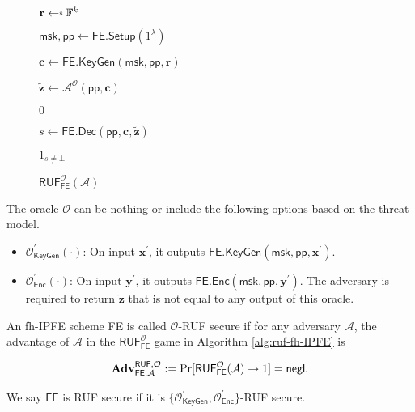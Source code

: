 \begin{figure}[H]
\centering

	\begin{minipage}[t]{0.55\textwidth}
	\begin{algorithm}[H]
	\caption{$\textsf{RUF}^{\mathcal{O}}_{\textsf{FE}}(\mathcal{A})$}
	\label{alg:ruf-fh-IPFE}
	\begin{algorithmic}[1]
		\State $\mathbf{r} \getsdollar \mathbb{F}^{k}$ \label{alg:oracle-ruf-fh-IPFE:r}

		\State $\textsf{msk}, \textsf{pp} \gets \textsf{FE.Setup}(1^\lambda)$

		\State $\mathbf{c} \gets \textsf{FE.KeyGen}(\textsf{msk}, \textsf{pp}, \mathbf{r})$

		\State $\mathbf{\tilde{z}} \gets \mathcal{A}^{\mathcal{O}} ( \textsf{pp}, \mathbf{c} )$

			
			\State \Return $0$
		
		\EndIf

		\State $s \gets \textsf{FE.Dec}(\textsf{pp}, \mathbf{c}, \mathbf{\tilde{z}} )$

		\State \Return $1_{s \neq \bot}$
	\end{algorithmic}
	\end{algorithm}
	\end{minipage}

\end{figure}

The oracle $\mathcal{O}$ can be nothing or include the following options based on the threat model.

\begin{itemize}

	\item $\mathcal{O}^\prime_{\textsf{KeyGen}}(\cdot)$: On input $\mathbf{x}^\prime$, it outputs $\textsf{FE.KeyGen}(\textsf{msk}, \textsf{pp}, \mathbf{x}^\prime)$.
	
	\item $\mathcal{O}^\prime_{\textsf{Enc}}(\cdot)$: On input $\mathbf{y}^\prime$, it outputs $\textsf{FE.Enc}(\textsf{msk}, \textsf{pp}, \mathbf{y}^\prime)$. The adversary is required to return $\mathbf{\tilde{z}}$ that is not equal to any output of this oracle.
\end{itemize}

\begin{definition}

	An fh-IPFE scheme \textsf{FE} is called $\mathcal{O}$-RUF secure if for any adversary $\mathcal{A}$, the advantage of $\mathcal{A}$ in the $\textsf{RUF}^{\mathcal{O}}_\textsf{FE}$ game in Algorithm \ref{alg:ruf-fh-IPFE} is

\[
	\mathbf{Adv}_{\textsf{FE}, \mathcal{A}}^{\textsf{RUF}, \mathcal{O}} := \Pr[\textsf{RUF}^{\mathcal{O}}_{\textsf{FE}}(\mathcal{A}) \to 1 ] = \mathsf{negl}.
\]

\noindent We say $\textsf{FE}$ is RUF secure if it is $\{ \mathcal{O}^\prime_{\textsf{KeyGen}}, \mathcal{O}^\prime_{\textsf{Enc}} \}$-RUF secure.

\end{definition}

